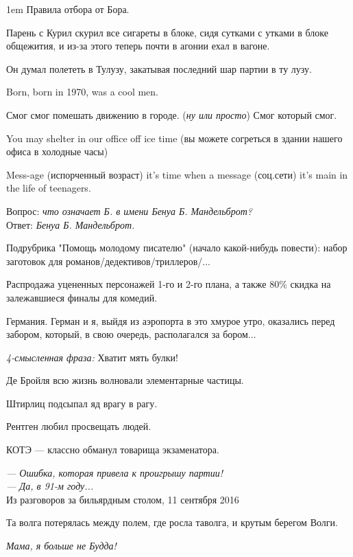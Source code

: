 \begin{flushleft}\parskip1em
Правила отбора от Бора.

Парень с Курил скурил все сигареты в блоке, сидя сутками с утками в блоке общежития, и из-за этого теперь почти в агонии ехал в вагоне.

Он думал полететь в Тулузу, закатывая последний шар партии в ту лузу.

Born, born in 1970, was a cool men.

Смог смог помешать движению в городе. (\emph{ну или просто}) Смог который смог.

You may shelter in our office off ice time (вы можете согреться в здании нашего офиса в холодные часы)

Mess-age (испорченный возраст) it's time when a message (соц.сети) it's main in the life of teenagers.

Вопрос: \emph{что означает Б. в имени Бенуа Б. Мандельброт?}\\
Ответ: \emph{Бенуа Б. Мандельброт.}

Подрубрика "Помощь молодому писателю" (начало какой-нибудь повести): набор заготовок для романов/дедективов/триллеров/...

Распродажа уцененных персонажей 1-го и 2-го плана, а также 80\% скидка на залежавшиеся финалы для комедий.

Германия. Герман и я, выйдя из аэропорта в это хмурое утро, оказались перед забором, который, в свою очередь, располагался за бором...

\emph{4-смысленная фраза:} Хватит мять булки!


Де Бройля всю жизнь волновали элементарные частицы.


Штирлиц подсыпал яд врагу в рагу.


Рентген любил просвещать людей.


КОТЭ --- классно обманул товарища экзаменатора.


\emph{--- Ошибка, которая привела к проигрышу партии!\\
--- Да, в 91-м году...}\\
Из разговоров за бильярдным столом, 11 сентября 2016 


Та волга потерялась между полем, где росла таволга, и крутым берегом Волги. %


\emph{Мама, я больше не Будда!}
\end{flushleft}

